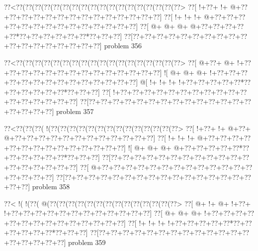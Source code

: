 \vbox{\vbox{\goo
\0??<\0??(\0??(\0??(\0??(\0??(\0??(\0??(\0??(\0??(\0??(\0??(\0??(\0??(\0??(\0??(\0??(\0??(\0??>
\0??[\- !+\0??+\- !+\- @+\0??+\0??+\0??+\0??+\0??+\0??+\0??+\0??+\0??+\0??+\0??+\0??+\0??+\0??]
\0??[\- !+\- !+\- !+\- @+\0??+\0??+\0??+\0??+\0??+\0??+\0??+\0??+\0??+\0??+\0??+\0??+\0??+\0??]
\0??[\- @+\- @+\- @+\- @+\0??+\0??+\0??+\0??+\0??*\0??+\0??+\0??+\0??+\0??+\0??*\0??+\0??+\0??]
\0??[\0??+\0??+\0??+\0??+\0??+\0??+\0??+\0??+\0??+\0??+\0??+\0??+\0??+\0??+\0??+\0??+\0??+\0??]
}
\hfil problem 356\hfil\break
}



\vbox{\vbox{\goo
\0??<\0??(\0??(\0??(\0??(\0??(\0??(\0??(\0??(\0??(\0??(\0??(\0??(\0??(\0??(\0??(\0??(\0??(\0??>
\0??[\- @+\0??+\- @+\- !+\0??+\0??+\0??+\0??+\0??+\0??+\0??+\0??+\0??+\0??+\0??+\0??+\0??+\0??]
\- ![\- @+\- @+\- @+\- !+\0??+\0??+\0??+\0??+\0??+\0??+\0??+\0??+\0??+\0??+\0??+\0??+\0??+\0??]
\- @[\- !+\- !+\- !+\- !+\0??+\0??+\0??+\0??+\0??*\0??+\0??+\0??+\0??+\0??+\0??*\0??+\0??+\0??]
\0??[\- !+\0??+\0??+\0??+\0??+\0??+\0??+\0??+\0??+\0??+\0??+\0??+\0??+\0??+\0??+\0??+\0??+\0??]
\0??[\0??+\0??+\0??+\0??+\0??+\0??+\0??+\0??+\0??+\0??+\0??+\0??+\0??+\0??+\0??+\0??+\0??+\0??]
}
\hfil problem 357\hfil\break
}



\vbox{\vbox{\goo
\0??<\0??(\0??(\0??(\- !(\0??(\0??(\0??(\0??(\0??(\0??(\0??(\0??(\0??(\0??(\0??(\0??(\0??(\0??>
\0??[\- !+\0??+\- !+\- @+\0??+\- @+\0??+\0??+\0??+\0??+\0??+\0??+\0??+\0??+\0??+\0??+\0??+\0??]
\0??[\- !+\- !+\- !+\- @+\0??+\0??+\0??+\0??+\0??+\0??+\0??+\0??+\0??+\0??+\0??+\0??+\0??+\0??]
\- ![\- @+\- @+\- @+\- @+\0??+\0??+\0??+\0??+\0??*\0??+\0??+\0??+\0??+\0??+\0??*\0??+\0??+\0??]
\0??[\0??+\0??+\0??+\0??+\0??+\0??+\0??+\0??+\0??+\0??+\0??+\0??+\0??+\0??+\0??+\0??+\0??+\0??]
\0??[\- @+\0??+\0??+\0??+\0??+\0??+\0??+\0??+\0??+\0??+\0??+\0??+\0??+\0??+\0??+\0??+\0??+\0??]
\0??[\0??+\0??+\0??+\0??+\0??+\0??+\0??+\0??+\0??+\0??+\0??+\0??+\0??+\0??+\0??+\0??+\0??+\0??]
}
\hfil problem 358\hfil\break
}



\vbox{\vbox{\goo
\0??<\- !(\- !(\0??(\- @(\0??(\0??(\0??(\0??(\0??(\0??(\0??(\0??(\0??(\0??(\0??(\0??(\0??(\0??>
\0??[\- @+\- !+\- @+\- !+\0??+\- !+\0??+\0??+\0??+\0??+\0??+\0??+\0??+\0??+\0??+\0??+\0??+\0??]
\0??[\- @+\- @+\- @+\- !+\0??+\0??+\0??+\0??+\0??+\0??+\0??+\0??+\0??+\0??+\0??+\0??+\0??+\0??]
\0??[\- !+\- !+\- !+\- !+\0??+\0??+\0??+\0??+\0??*\0??+\0??+\0??+\0??+\0??+\0??*\0??+\0??+\0??]
\0??[\0??+\0??+\0??+\0??+\0??+\0??+\0??+\0??+\0??+\0??+\0??+\0??+\0??+\0??+\0??+\0??+\0??+\0??]
}
\hfil problem 359\hfil\break
}



